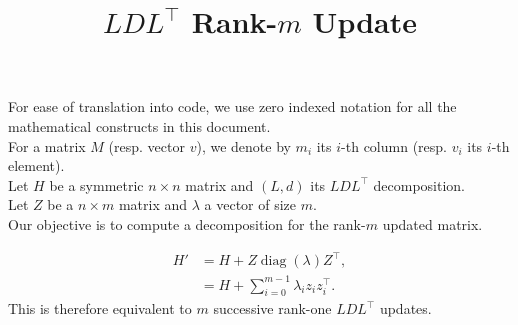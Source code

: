 \documentclass{article}
\DeclareMathOperator{\diag}{diag}
\begin{document}
\title{$LDL^{\top}$ Rank-$m$ Update}
\date{}
\maketitle

\noindent For ease of translation into code, we use zero indexed notation for all the mathematical constructs in this document.\\
For a matrix $M$ (resp. vector $v$), we denote by $m_i$ its $i$-th column (resp. $v_i$ its $i$-th element).\\

\noindent Let $H$ be a symmetric $n\times n$ matrix and $(L, d)$ its $LDL^{\top}$ decomposition.\\
Let $Z$ be a $n\times m$ matrix and $\lambda$ a vector of size $m$.\\
Our objective is to compute a decomposition for the rank-$m$ updated matrix.

\begin{align}
	\label{eq:rank_update_definition}
	H' & = H + Z \diag(\lambda) Z^{\top},                 \\
	   & = H + \sum_{i=0}^{m-1} \lambda_i z_i z_i^{\top}.
\end{align}
This is therefore equivalent to $m$ successive rank-one $LDL^{\top}$ updates.
\end{document}
